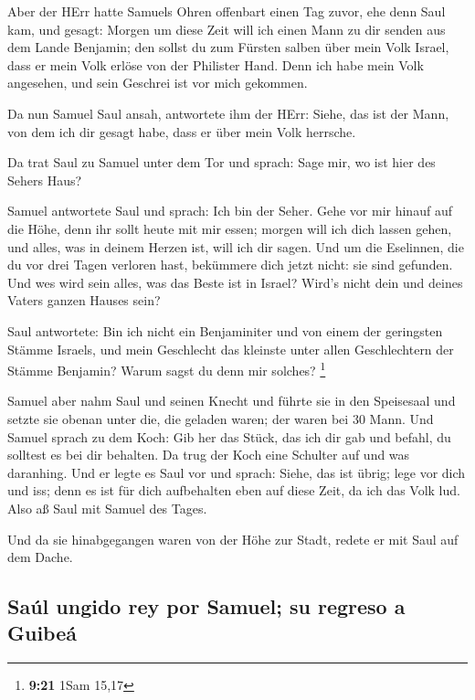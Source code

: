  Aber der HErr hatte Samuels Ohren offenbart einen Tag
zuvor, ehe denn Saul kam, und gesagt:  Morgen um diese
Zeit will ich einen Mann zu dir senden aus dem Lande Benjamin; den
sollst du zum Fürsten salben über mein Volk Israel, dass er mein Volk
erlöse von der Philister Hand. Denn ich habe mein Volk angesehen, und
sein Geschrei ist vor mich gekommen.

 Da nun Samuel Saul ansah, antwortete ihm der HErr:
Siehe, das ist der Mann, von dem ich dir gesagt habe, dass er über mein
Volk herrsche.

 Da trat Saul zu Samuel unter dem Tor und sprach: Sage
mir, wo ist hier des Sehers Haus?

 Samuel antwortete Saul und sprach: Ich bin der Seher.
Gehe vor mir hinauf auf die Höhe, denn ihr sollt heute mit mir essen;
morgen will ich dich lassen gehen, und alles, was in deinem Herzen ist,
will ich dir sagen.  Und um die Eselinnen, die du vor
drei Tagen verloren hast, bekümmere dich jetzt nicht: sie sind gefunden.
Und wes wird sein alles, was das Beste ist in Israel? Wird's nicht dein
und deines Vaters ganzen Hauses sein?

 Saul antwortete: Bin ich nicht ein Benjaminiter und von
einem der geringsten Stämme Israels, und mein Geschlecht das kleinste
unter allen Geschlechtern der Stämme Benjamin? Warum sagst du denn mir
solches? \footnote{\textbf{9:21} 1Sam 15,17}

 Samuel aber nahm Saul und seinen Knecht und führte sie
in den Speisesaal und setzte sie obenan unter die, die geladen waren;
der waren bei 30 Mann.  Und Samuel sprach zu dem Koch:
Gib her das Stück, das ich dir gab und befahl, du solltest es bei dir
behalten.  Da trug der Koch eine Schulter auf und was
daranhing. Und er legte es Saul vor und sprach: Siehe, das ist übrig;
lege vor dich und iss; denn es ist für dich aufbehalten eben auf diese
Zeit, da ich das Volk lud. Also aß Saul mit Samuel des Tages.

 Und da sie hinabgegangen waren von der Höhe zur Stadt,
redete er mit Saul auf dem Dache.

\hypertarget{sauxfal-ungido-rey-por-samuel-su-regreso-a-guibeuxe1}{%
\subsection{Saúl ungido rey por Samuel; su regreso a
Guibeá}\label{sauxfal-ungido-rey-por-samuel-su-regreso-a-guibeuxe1}}

